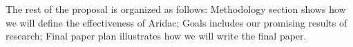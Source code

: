 \documentclass[10pt, conference,compsoc]{IEEEtran}
\begin{document}
The rest of the proposal is organized as follows: Methodology section shows how we will define the effectiveness of Aridac; Goals includes our promising results of research; Final paper plan illustrates how we will write the final paper. \\


%
%



%
%
\end{document}
